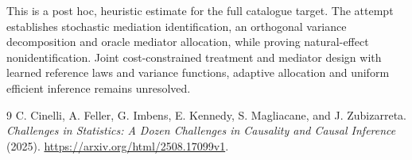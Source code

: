 \documentclass[11pt]{article}
\theoremstyle{remark}
\begin{document}
This is a post hoc, heuristic estimate for the full catalogue target.
The attempt establishes stochastic mediation identification, an orthogonal variance decomposition and oracle mediator allocation, while proving natural-effect nonidentification. Joint cost-constrained treatment and mediator design with learned reference laws and variance functions, adaptive allocation and uniform efficient inference remains unresolved.

\begin{thebibliography}{9}
 C. Cinelli, A. Feller, G. Imbens, E. Kennedy, S. Magliacane, and J. Zubizarreta. \emph{Challenges in Statistics: A Dozen Challenges in Causality and Causal Inference} (2025). \url{https://arxiv.org/html/2508.17099v1}.
\end{thebibliography}
\end{document}
